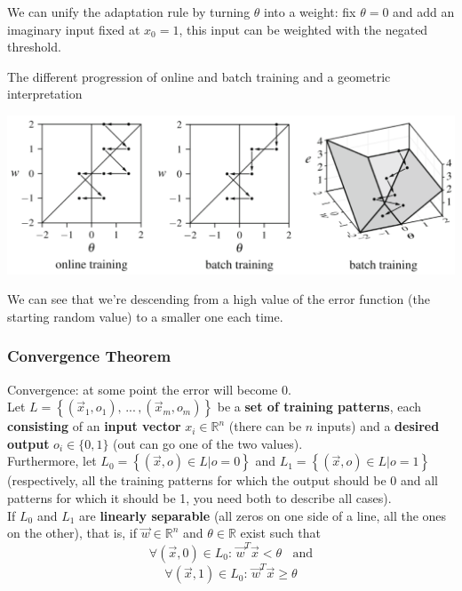 \documentclass[11pt]{article}
\begin{document}
		We can unify the adaptation rule by turning $\theta$ into a weight: fix $\theta = 0$ and add an imaginary input fixed at $x_0 = 1$, this input can be weighted with the negated threshold.\\
		
		\newpage
		
		The different progression of online and batch training and a geometric interpretation
		\begin{center}
			\includegraphics[width=0.9\columnwidth]{img/NN/delta3}
		\end{center}
		We can see that we're descending from a high value of the error function (the starting random value) to a smaller one each time.\\
		
		\newpage
		
		\subsubsection{Convergence Theorem}
		Convergence: at some point the error will become 0.\\
		
		Let $L = \left\{ (\vec{x}_1, o_1), \, ... \, , (\vec{x}_m, o_m)\right\}$ be a \textbf{set of training patterns}, each \textbf{consisting} of an \textbf{input vector} $x_i \in \mathbb{R}^n$ (there can be $n$ inputs) and a \textbf{desired output} $o_i \in \{0, 1\}$ (out can go one of the two values).\\
		
		Furthermore, let $L_0 = \left\{\left(\vec{x}, o\right) \in L | o = 0 \right\}$ and $L_1 = \left\{ \left(\vec{x}, o\right) \in L | o = 1\right\}$ (respectively, all the training patterns for which the output should be 0 and all patterns for which it should be 1, you need both to describe all cases).\\
		
		If $L_0$ and $L_1$ are \textbf{linearly separable} (all zeros on one side of a line, all the ones on the other), that is, if $\vec{w} \in \mathbb{R}^n$ and $\theta \in \mathbb{R}$ exist such that
		$$ \forall \left(\vec{x}, 0 \right) \in L_0: \, \vec{w}^T \vec{x} < \theta \;\; \text{ and}$$
		$$ \forall \left(\vec{x}, 1 \right) \in L_0: \, \vec{w}^T \vec{x} \geq \theta $$
		
\end{document}
